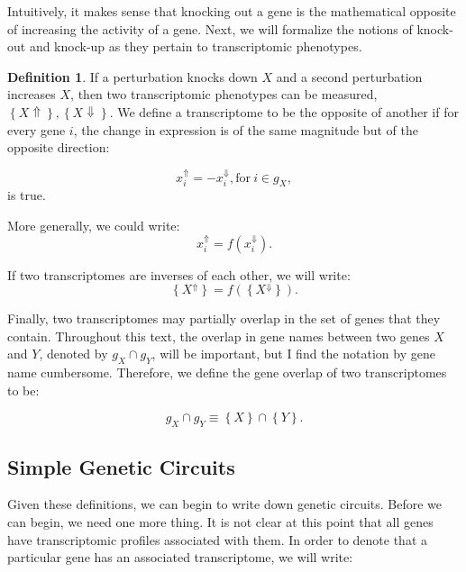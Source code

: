 \documentclass{article}
\newcommand{\transcr}[1]{\left \{ #1 \right \}}
\theoremstyle{definition}
\newtheorem{definition}{Definition}[section]
\begin{document}
Intuitively, it makes sense that knocking out a gene is the mathematical opposite of increasing the activity of a gene. Next, we will formalize the notions of knock-out and knock-up as they pertain to transcriptomic phenotypes.

\begin{definition}
  If a perturbation knocks down $X$ and a second perturbation increases $X$, then two transcriptomic phenotypes can be  measured, $\transcr{X\Uparrow}, \transcr{X\Downarrow}$. We define a transcriptome to be the opposite of another if for every gene $i$, the change in expression is of the same magnitude but of the opposite direction:

  \begin{equation}
    x_i^\Uparrow = - x_i^\Downarrow, \textrm{for} ~i \in g_X,
  \end{equation}
  is true.

  More generally, we could write:
  \begin{equation}
    x_i^\Uparrow = f(x_i^\Downarrow).
  \end{equation}

  If two transcriptomes are inverses of each other, we will write:
  \begin{equation}
    \transcr{X^\Uparrow} = f(\transcr{X^\Downarrow}).
  \end{equation}
\end{definition}

Finally, two transcriptomes may partially overlap in the set of genes that they contain. Throughout this text, the overlap in gene names between two genes $X$ and $Y$, denoted by $g_X \cap g_Y$, will be important, but I find the notation by gene name cumbersome. Therefore, we define the gene overlap of two transcriptomes to be:

\begin{equation}
  g_X \cap g_Y \equiv \transcr{X} \cap \transcr{Y}.
\end{equation}


\subsection*{Simple Genetic Circuits}

Given these definitions, we can begin to write down genetic circuits. Before we can begin, we need one more thing. It is not clear at this point that all genes have transcriptomic profiles associated with them. In order to denote that a particular gene has an associated transcriptome, we will write:
\end{document}
